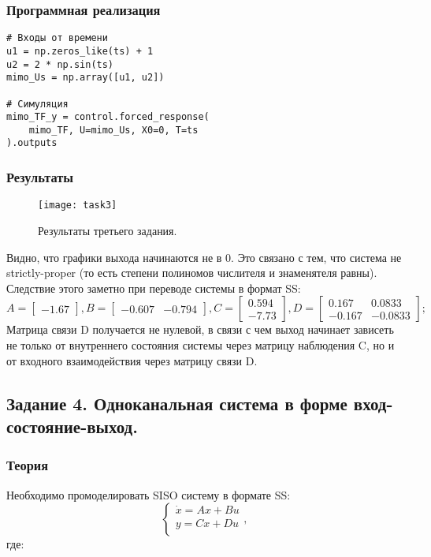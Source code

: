 \documentclass[16pt]{article}
\begin{document}
\subsubsection{Программная реализация}
\begin{verbatim}
# Входы от времени
u1 = np.zeros_like(ts) + 1
u2 = 2 * np.sin(ts)
mimo_Us = np.array([u1, u2])

# Симуляция
mimo_TF_y = control.forced_response(
    mimo_TF, U=mimo_Us, X0=0, T=ts
).outputs
\end{verbatim}

\subsubsection{Результаты}
\begin{figure}[H]
	\centering
	\texttt{[image: task3]}
	\caption{Результаты третьего задания.}
	\label{fig:fig3}
\end{figure}
Видно, что графики выхода начинаются не в 0. Это связано с тем, что система не strictly-proper (то есть степени полиномов числителя и знаменятеля равны). Следствие этого заметно при переводе системы в формат SS: 
\[ A = \begin{bmatrix}
    -1.67
    \end{bmatrix},
    B = \begin{bmatrix}
        -0.607 & -0.794
        \end{bmatrix},
    C = \begin{bmatrix}
        0.594 \\
        -7.73
        \end{bmatrix},
    D = \begin{bmatrix}
        0.167 & 0.0833 \\
        -0.167 & -0.0833
        \end{bmatrix};
\]
Матрица связи D получается не нулевой, в связи с чем выход начинает зависеть не только от внутреннего состояния системы через матрицу наблюдения C, но и от входного взаимодействия через матрицу связи D.

\newpage
\subsection{Задание 4. Одноканальная система в форме вход-состояние-выход.}
\subsubsection{Теория}
Необходимо промоделировать SISO систему в формате SS:
\[ 
    \begin{cases}
        \dot{x} = Ax + Bu \\
        y = Cx + Du \\
    \end{cases},
\]
где:
\end{document}
